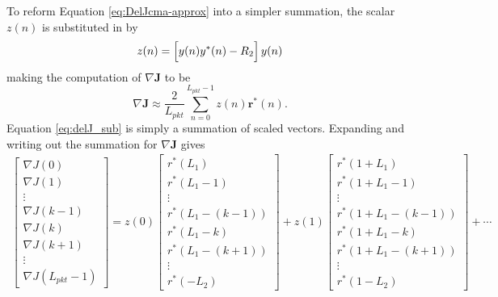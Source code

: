 To reform Equation \eqref{eq:DelJcma-approx} into a simpler summation, the scalar $z(n)$ is substituted in by
\begin{equation}
z(n) = 	\left[ \vphantom{\displaystyle\sum}  y(n) y^\ast(n) - R_2 \right] y(n)
\end{equation} 
making the computation of $\nabla \mathbf{J}$ to be
\begin{equation}
	\nabla \mathbf{J} \approx \frac{2}{L_{pkt}} \sum_{n=0}^{L_{pkt}-1}
	z(n)
	\mathbf{r}^\ast(n).
	\label{eq:delJ_sub}
\end{equation}
Equation \eqref{eq:delJ_sub} is simply a summation of scaled vectors.
Expanding and writing out the summation for $\nabla \mathbf{J}$ gives
\begin{multline}
\begin{bmatrix} \nabla J(0) \\ \nabla J(1) \\ \vdots \\ \nabla J(k-1) \\ \nabla J(k) \\ \nabla J(k+1) \\ \vdots \\ \nabla J(L_{pkt}-1) \end{bmatrix}
	= 
	z(0)
	\begin{bmatrix} r^\ast(L_1) \\ r^\ast(L_1-1) \\ \vdots \\ r^\ast(L_1-(k-1)) \\ r^\ast(L_1-k) \\ r^\ast(L_1-(k+1)) \\ \vdots \\ r^\ast(-L_2) \end{bmatrix} +
	z(1)
	\begin{bmatrix} r^\ast(1+L_1) \\ r^\ast(1+L_1-1) \\ \vdots \\ r^\ast(1+L_1-(k-1)) \\ r^\ast(1+L_1-k) \\ r^\ast(1+L_1-(k+1)) \\ \vdots \\ r^\ast(1-L_2) \end{bmatrix} + \cdots

\end{multline}
